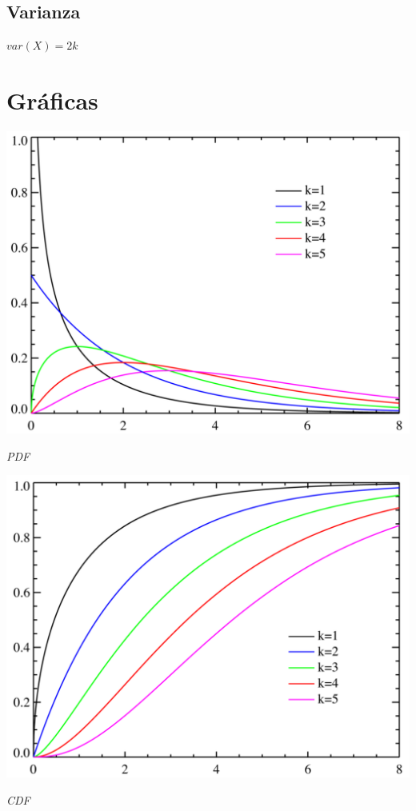 \subsection{Varianza}
\begin{center}
	$var(X) = 2k$
\end{center}

\section{Gráficas}
\begin{center}
	\includegraphics[scale=0.5]{imgs/chi-pdf.png}
	
	\textit{PDF}
\end{center}

\begin{center}
	\includegraphics[scale=0.5]{imgs/chi-cdf.png}
	
	\textit{CDF}
	\end{center}

